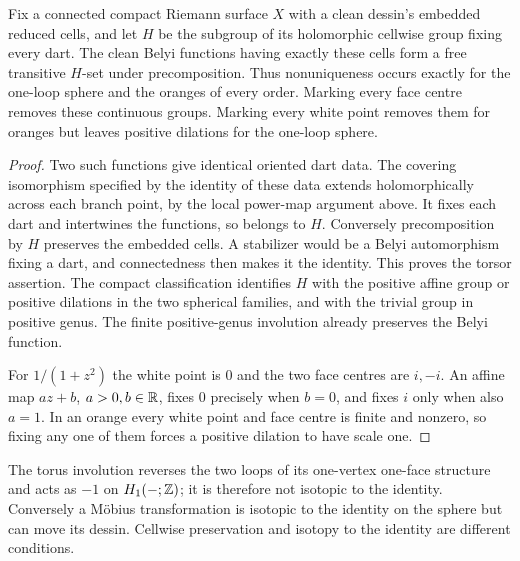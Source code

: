 \begin{proposition}\label{prop:fixed-cell-torsor}
Fix a connected compact Riemann surface $X$ with a clean dessin's embedded
reduced cells, and let $H$ be the subgroup of its holomorphic
cellwise group fixing every dart. The clean Belyi functions having
exactly these cells form a free transitive $H$-set under precomposition.
Thus nonuniqueness occurs exactly for the one-loop sphere and the
oranges of every order. Marking every face centre removes these
continuous groups. Marking every white point removes them for
oranges but leaves positive dilations for the one-loop sphere.
\end{proposition}
\begin{proof}
Two such functions give identical oriented dart data. The covering
isomorphism specified by the identity of these data extends
holomorphically across each branch point, by the local power-map
argument above. It fixes each dart and intertwines the functions,
so belongs to $H$. Conversely precomposition by $H$ preserves the
embedded cells. A stabilizer would be a Belyi automorphism fixing a
dart, and connectedness then makes it the identity. This proves the
torsor assertion. The compact classification identifies $H$ with
the positive affine group or positive dilations in the two spherical
families, and with the trivial group in positive genus. The finite
positive-genus involution already preserves the Belyi function.

For $1/(1+z^2)$ the white point is $0$ and the two face centres are
$i,-i$. An affine map $az+b$, $a>0,b\in\mathbb R$, fixes $0$ precisely when
$b=0$, and fixes $i$ only when also $a=1$. In an orange every white
point and face centre is finite and nonzero, so fixing any one of them
forces a positive dilation to have scale one.
\end{proof}
The torus involution reverses the two loops of its one-vertex
one-face structure and acts as $-1$ on $H_1(-;\mathbb Z)$; it is therefore
not isotopic to the identity. Conversely a M\"obius transformation is
isotopic to the identity on the sphere but can move its dessin.
Cellwise preservation and isotopy to the identity are different conditions.

